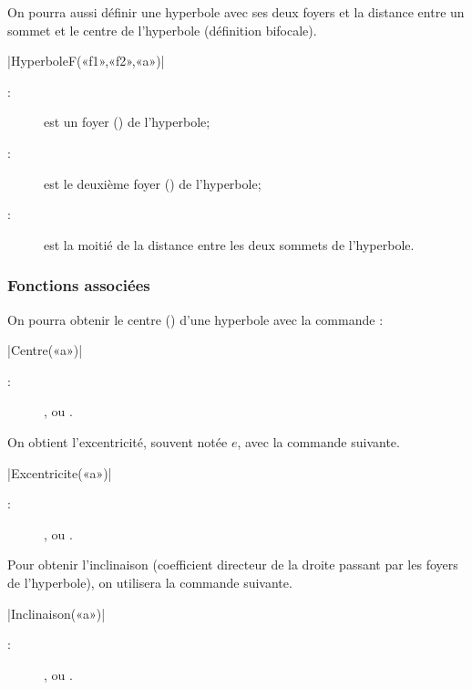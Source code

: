 \documentclass[a4paper,french]{article}
\begin{document}
On pourra aussi définir une hyperbole avec ses deux foyers et la distance entre
un sommet et le centre de l’hyperbole  (définition bifocale).

\begin{colourband}
  \macro|HyperboleF(«f1»,«f2»,«a»)|
  \begin{description}
    \item[:] est un foyer () de l’hyperbole;
    \item[:] est le deuxième foyer () de l’hyperbole;
    \item[:] est la moitié de la distance entre les deux sommets de l’hyperbole. 
  \end{description}
\end{colourband}

\subsubsection{Fonctions associées}

On pourra obtenir le centre () d'une hyperbole avec la commande :
\begin{colourband}
  \macro|Centre(«a»)|
  \begin{description}
    \item[:]  ,  ou .
  \end{description}
\end{colourband}


On obtient l'excentricité, souvent notée $e$, avec la commande suivante.

\begin{colourband}
\macro|Excentricite(«a»)|
\begin{description}
  \item[:]  ,  ou .
\end{description}
\end{colourband}
\bigskip


Pour obtenir l'inclinaison (coefficient directeur de la droite passant par les
foyers de l'hyperbole), on utilisera la commande suivante.

\begin{colourband}
\macro|Inclinaison(«a»)|
\begin{description}
  \item[:]  ,  ou .
\end{description}
\end{colourband}
\bigskip
\end{document}
